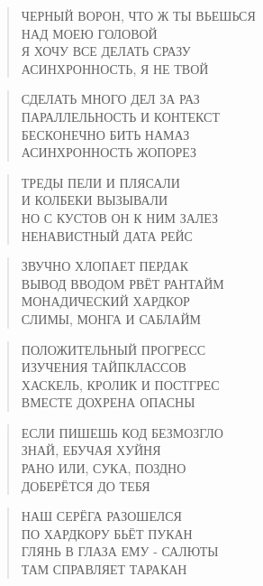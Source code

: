 \poemtitle{***}
\begin{verse}
ЧЕРНЫЙ ВОРОН, ЧТО Ж ТЫ ВЬЕШЬСЯ\\
НАД МОЕЮ ГОЛОВОЙ\\
Я ХОЧУ ВСЕ ДЕЛАТЬ СРАЗУ \\
АСИНХРОННОСТЬ, Я НЕ ТВОЙ
\end{verse}

\poemtitle{***}
\begin{verse}
СДЕЛАТЬ МНОГО ДЕЛ ЗА РАЗ\\
ПАРАЛЛЕЛЬНОСТЬ И КОНТЕКСТ\\
БЕСКОНЕЧНО БИТЬ НАМАЗ\\
АСИНХРОННОСТЬ ЖОПОРЕЗ
\end{verse}

\poemtitle{***}
\begin{verse}
ТРЕДЫ ПЕЛИ И ПЛЯСАЛИ\\
И КОЛБЕКИ ВЫЗЫВАЛИ\\
НО С КУСТОВ ОН К НИМ ЗАЛЕЗ\\
НЕНАВИСТНЫЙ ДАТА РЕЙС
\end{verse}

\poemtitle{***}
\begin{verse}
ЗВУЧНО ХЛОПАЕТ ПЕРДАК\\
ВЫВОД ВВОДОМ РВЁТ РАНТАЙМ\\
МОНАДИЧЕСКИЙ ХАРДКОР\\
СЛИМЫ, МОНГА И САБЛАЙМ
\end{verse}

\poemtitle{***}
\begin{verse}
ПОЛОЖИТЕЛЬНЫЙ ПРОГРЕСС\\
ИЗУЧЕНИЯ ТАЙПКЛАССОВ\\
ХАСКЕЛЬ, КРОЛИК И ПОСТГРЕС\\
ВМЕСТЕ ДОХРЕНА ОПАСНЫ
\end{verse}

\poemtitle{***}
\begin{verse}
ЕСЛИ ПИШЕШЬ КОД БЕЗМОЗГЛО\\
ЗНАЙ, ЕБУЧАЯ ХУЙНЯ\\
РАНО ИЛИ, СУКА,  ПОЗДНО\\
ДОБЕРЁТСЯ ДО ТЕБЯ
\end{verse}

\poemtitle{***}
\begin{verse}
НАШ СЕРЁГА РАЗОШЕЛСЯ\\
ПО ХАРДКОРУ БЬЁТ ПУКАН\\
ГЛЯНЬ В ГЛАЗА ЕМУ - САЛЮТЫ\\
ТАМ СПРАВЛЯЕТ ТАРАКАН
\end{verse}

